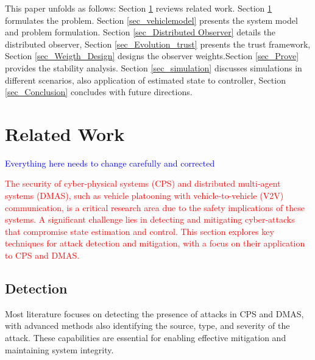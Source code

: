 \documentclass[letterpaper, 10pt, conference]{ieeeconf}  %
\begin{document}
This paper unfolds as follows: Section \ref{sec_related_work} reviews related work. Section \ref{sec_related_work} formulates the problem. Section \ref{sec_vehiclemodel} presents the system model and problem formulation. Section \ref{sec_Distributed Observer} details the distributed observer, Section \ref{sec_Evolution_trust} presents the trust framework, Section \ref{sec_Weigth_Design} designs the observer weights.Section \ref{sec_Prove} provides the stability analysis. Section \ref{sec_simulation} discusses simulations in different scenarios, also application of estimated state to controller, Section \ref{sec_Conclusion} concludes with future directions.

\section{Related Work}\label{sec_related_work}
\textcolor{blue}{Everything here needs to change carefully and corrected}

\textcolor{red}{The security of cyber-physical systems (CPS) and distributed multi-agent systems (DMAS), such as vehicle platooning with vehicle-to-vehicle (V2V) communication, is a critical research area due to the safety implications of these systems. A significant challenge lies in detecting and mitigating cyber-attacks that compromise state estimation and control. This section explores key techniques for attack detection and mitigation, with a focus on their application to CPS and DMAS.
}

\subsection*{Detection}
Most literature focuses on detecting the presence of attacks in CPS and DMAS, with advanced methods also identifying the source, type, and severity of the attack. These capabilities are essential for enabling effective mitigation and maintaining system integrity.
\end{document}
